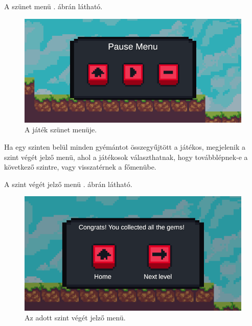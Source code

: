 A szünet menü . ábrán látható.

\begin{figure}[ht]
\centering
\includegraphics[scale = 0.5]{images/pausemenu.png}
\caption{A játék szünet menüje.}
\label{fig:pausemenu}
\end{figure}

Ha egy szinten belül minden gyémántot összegyűjtött a játékos, megjelenik a szint végét jelző menü, ahol a játékosok választhatnak, hogy továbblépnek-e a következő szintre, vagy visszatérnek a főmenübe. 

A szint végét jelző menü . ábrán látható.

\begin{figure}[ht]
\centering
\includegraphics[scale = 0.5]{images/finishedlevelmenu.png}
\caption{Az adott szint végét jelző menü.}
\label{fig:finishedlevelmenu}
\end{figure}




